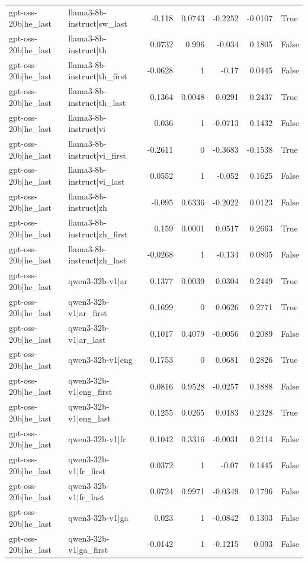 \begin{table}
\begin{tabular}{l l r r r r l}
gpt-oss-20b|he_last & llama3-8b-instruct|sw_last & -0.118 & 0.0743 & -0.2252 & -0.0107 & True \\
gpt-oss-20b|he_last & llama3-8b-instruct|th & 0.0732 & 0.996 & -0.034 & 0.1805 & False \\
gpt-oss-20b|he_last & llama3-8b-instruct|th_first & -0.0628 & 1 & -0.17 & 0.0445 & False \\
gpt-oss-20b|he_last & llama3-8b-instruct|th_last & 0.1364 & 0.0048 & 0.0291 & 0.2437 & True \\
gpt-oss-20b|he_last & llama3-8b-instruct|vi & 0.036 & 1 & -0.0713 & 0.1432 & False \\
gpt-oss-20b|he_last & llama3-8b-instruct|vi_first & -0.2611 & 0 & -0.3683 & -0.1538 & True \\
gpt-oss-20b|he_last & llama3-8b-instruct|vi_last & 0.0552 & 1 & -0.052 & 0.1625 & False \\
gpt-oss-20b|he_last & llama3-8b-instruct|zh & -0.095 & 0.6336 & -0.2022 & 0.0123 & False \\
gpt-oss-20b|he_last & llama3-8b-instruct|zh_first & 0.159 & 0.0001 & 0.0517 & 0.2663 & True \\
gpt-oss-20b|he_last & llama3-8b-instruct|zh_last & -0.0268 & 1 & -0.134 & 0.0805 & False \\
gpt-oss-20b|he_last & qwen3-32b-v1|ar & 0.1377 & 0.0039 & 0.0304 & 0.2449 & True \\
gpt-oss-20b|he_last & qwen3-32b-v1|ar_first & 0.1699 & 0 & 0.0626 & 0.2771 & True \\
gpt-oss-20b|he_last & qwen3-32b-v1|ar_last & 0.1017 & 0.4079 & -0.0056 & 0.2089 & False \\
gpt-oss-20b|he_last & qwen3-32b-v1|eng & 0.1753 & 0 & 0.0681 & 0.2826 & True \\
gpt-oss-20b|he_last & qwen3-32b-v1|eng_first & 0.0816 & 0.9528 & -0.0257 & 0.1888 & False \\
gpt-oss-20b|he_last & qwen3-32b-v1|eng_last & 0.1255 & 0.0265 & 0.0183 & 0.2328 & True \\
gpt-oss-20b|he_last & qwen3-32b-v1|fr & 0.1042 & 0.3316 & -0.0031 & 0.2114 & False \\
gpt-oss-20b|he_last & qwen3-32b-v1|fr_first & 0.0372 & 1 & -0.07 & 0.1445 & False \\
gpt-oss-20b|he_last & qwen3-32b-v1|fr_last & 0.0724 & 0.9971 & -0.0349 & 0.1796 & False \\
gpt-oss-20b|he_last & qwen3-32b-v1|ga & 0.023 & 1 & -0.0842 & 0.1303 & False \\
gpt-oss-20b|he_last & qwen3-32b-v1|ga_first & -0.0142 & 1 & -0.1215 & 0.093 & False \\

\end{tabular}
\end{table}
